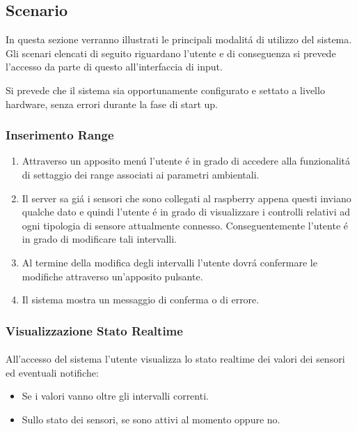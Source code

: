 \subsection{Scenario}

In questa sezione verranno illustrati le principali modalit\'a di utilizzo del sistema. Gli scenari elencati di seguito riguardano l'utente e di conseguenza si prevede l'accesso da parte di questo all'interfaccia di input.

Si prevede che il sistema sia opportunamente configurato e settato a livello hardware, senza errori durante la fase di start up.

\subsubsection{Inserimento Range}

\begin{enumerate}
  \item Attraverso un apposito men\'u l'utente \'e in grado di accedere alla funzionalit\'a di settaggio dei range associati ai parametri ambientali.
  \item Il server sa gi\'a i sensori che sono collegati al raspberry appena questi inviano qualche dato e quindi l'utente \'e in grado di visualizzare i controlli relativi ad ogni tipologia di sensore attualmente connesso. Conseguentemente l'utente \'e in grado di modificare tali intervalli.
  \item Al termine della modifica degli intervalli l'utente dovr\'a confermare le modifiche attraverso un'apposito pulsante.
  \item Il sistema mostra un messaggio di conferma o di errore.
\end{enumerate}

\subsubsection{Visualizzazione Stato Realtime}

\paragraph{} All'accesso del sistema l'utente visualizza lo stato realtime dei valori dei sensori ed eventuali notifiche:
\begin{itemize}
  \item Se i valori vanno oltre gli intervalli correnti.
  \item Sullo stato dei sensori, se sono attivi al momento oppure no.
\end{itemize}

